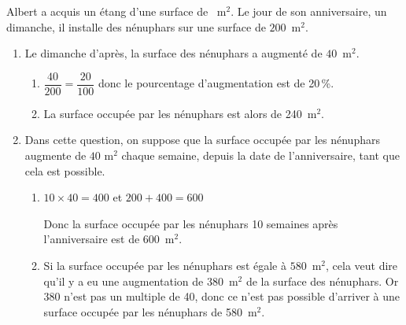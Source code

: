 
\medskip

Albert a acquis un étang d'une surface de ~m$^2$.
Le jour de son anniversaire, un dimanche, il installe des nénuphars sur une surface de $200$~m$^2$.


\begin{enumerate}
\item Le dimanche d'après, la surface des nénuphars a augmenté de $40$~m$^2$.
	\begin{enumerate}
		\item %
$\dfrac{40}{200}=\dfrac{20}{100}$ donc le pourcentage d'augmentation est de 20\,\%.		
				\item La surface occupée par les nénuphars est alors de 240~m$^2$.
	\end{enumerate}

\item Dans cette question, on suppose que la surface occupée par les nénuphars augmente de $40$ m$^2$ chaque semaine, depuis la date de l'anniversaire, tant que cela est possible.
	\begin{enumerate}
		\item $10\times 40=400$ et $200+400=600$
		
Donc la surface occupée par les nénuphars 10 semaines après l'anniversaire est de 600~m$^2$.
		\item %
Si  la surface occupée par les nénuphars est égale à $580$~m$^2$, cela veut dire qu'il y a eu une augmentation de 380~m$^2$ de la surface des nénuphars. Or 380 n'est pas un multiple de 40, donc ce n'est pas possible d'arriver à une surface occupée par les nénuphars de 580~m$^2$.
		

\end{enumerate}
\end{enumerate}

